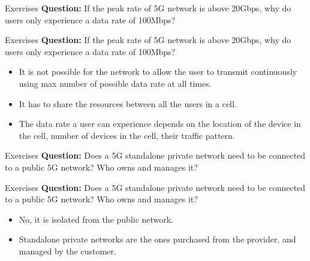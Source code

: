 \documentclass{beamer}
\begin{document}
\begin{frame}{Exercises}
  \textbf{Question:} If the peak rate of 5G network is above 20Gbps, why do users only experience a data rate of 100Mbps?
\end{frame}


\begin{frame}{Exercises}
  \textbf{Question:} If the peak rate of 5G network is above 20Gbps, why do users only experience a data rate of 100Mbps?
  \vspace*{0.75em}
  \begin{itemize}
    \item It is not possible for the network to allow the user to transmit continuously using max number of possible data rate at all times.
    \item It has to share the resources between all the users in a cell.
    \item The data rate a user can experience depends on the location of the device in the cell, number of devices in the cell, their traffic pattern.
  \end{itemize}
\end{frame}


\begin{frame}{Exercises}
  \textbf{Question:} Does a 5G standalone private network need to be connected to a public 5G network? Who owns and manages it?
\end{frame}

\begin{frame}{Exercises}
  \textbf{Question:} Does a 5G standalone private network need to be connected to a public 5G network? Who owns and manages it?
  \vspace*{0.75em}
  \begin{itemize}
    \item No, it is isolated from the public network. 
    \item Standalone private networks are the ones purchased from the provider, and managed by the customer.
  \end{itemize}
\end{frame}
\end{document}
